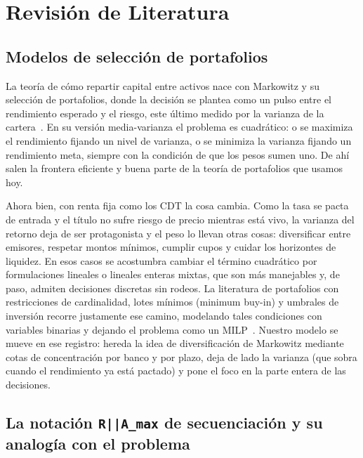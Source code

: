 \documentclass[11pt,a4paper]{article}
\begin{document}
\section{Revisión de Literatura}

\subsection{Modelos de selección de portafolios}

La teoría de cómo repartir capital entre activos nace con Markowitz y su selección de
portafolios, donde la decisión se plantea como un pulso entre el rendimiento esperado y el
riesgo, este último medido por la varianza de la cartera~\citep{markowitz1952}. En su versión media-varianza
el problema es cuadrático: o se maximiza el rendimiento fijando un nivel de varianza, o se
minimiza la varianza fijando un rendimiento meta, siempre con la condición de que los pesos
sumen uno. De ahí salen la frontera eficiente y buena parte de la teoría de portafolios que
usamos hoy.

Ahora bien, con renta fija como los CDT la cosa cambia. Como la tasa se pacta de entrada y
el título no sufre riesgo de precio mientras está vivo, la varianza del retorno deja de ser
protagonista y el peso lo llevan otras cosas: diversificar entre emisores, respetar montos
mínimos, cumplir cupos y cuidar los horizontes de liquidez. En esos casos se acostumbra
cambiar el término cuadrático por formulaciones lineales o lineales enteras mixtas, que son
más manejables y, de paso, admiten decisiones discretas sin rodeos. La literatura de
portafolios con restricciones de cardinalidad, lotes mínimos (minimum buy-in) y umbrales de
inversión recorre justamente ese camino, modelando tales condiciones con variables binarias y
dejando el problema como un MILP~\citep{bertsimas2009}. Nuestro modelo se mueve en ese registro: hereda la idea
de diversificación de Markowitz mediante cotas de concentración por banco y por plazo, deja de
lado la varianza (que sobra cuando el rendimiento ya está pactado) y pone el foco en la parte
entera de las decisiones.

\subsection{La notación \texttt{R||A\_max} de secuenciación y su analogía con el problema}
\end{document}
